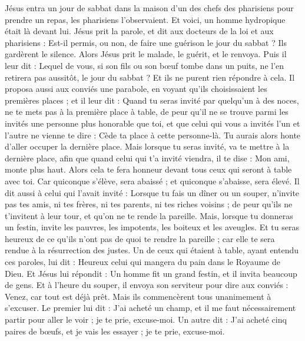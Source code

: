 \begin{multicols}{2}
{\VerseOne{}Jésus entra un jour de sabbat dans la maison d'un des chefs des pharisiens pour prendre un repas, les pharisiens l'observaient.
Et voici, un homme hydropique était là devant lui.
Jésus prit la parole, et dit aux docteurs de la loi et aux pharisiens : Est-il permis, ou non, de faire une guérison le jour du sabbat ?
Ils gardèrent le silence. Alors Jésus prit le malade, le guérit, et le renvoya.
Puis il leur dit : Lequel de vous, si son fils ou son bœuf tombe dans un puits, ne l’en retirera pas aussitôt, le jour du sabbat ?
Et ils ne purent rien répondre à cela.
Il proposa aussi aux conviés une parabole, en voyant qu’ils choisissaient les premières places ; et il leur dit :
Quand tu seras invité par quelqu'un à des noces, ne te mets pas à la première place à table, de peur qu'il ne se trouve parmi les invités une personne plus honorable que toi,
et que celui qui vous a invités l’un et l’autre ne vienne te dire : Cède ta place à cette personne-là. Tu aurais alors honte d’aller occuper la dernière place.
Mais lorsque tu seras invité, va te mettre à la dernière place, afin que quand celui qui t'a invité viendra, il te dise : Mon ami, monte plus haut. Alors cela te fera honneur devant tous ceux qui seront à table avec toi.
Car quiconque s'élève, sera abaissé ; et quiconque s'abaisse, sera élevé.
Il dit aussi à celui qui l'avait invité : Lorsque tu fais un dîner ou un souper, n'invite pas tes amis, ni tes frères, ni tes parents, ni tes riches voisins ; de peur qu'ils ne t’invitent à leur tour, et qu’on ne te rende la pareille.
Mais, lorsque tu donneras un festin, invite les pauvres, les impotents, les boiteux et les aveugles.
Et tu seras heureux de ce qu'ils n'ont pas de quoi te rendre la pareille ; car elle te sera rendue à la résurrection des justes.
\TextTitle{[grandeur]}
Un de ceux qui étaient à table, ayant entendu ces paroles, lui dit : Heureux celui qui mangera du pain dans le Royaume de Dieu.
Et Jésus lui répondit : Un homme fit un grand festin, et il invita beaucoup de gens.
Et à l'heure du souper, il envoya son serviteur pour dire aux conviés : Venez, car tout est déjà prêt.
Mais ils commencèrent tous unanimement à s'excuser. Le premier lui dit : J’ai acheté un champ, et il me faut nécessairement partir pour aller le voir ; je te prie, excuse-moi.
Un autre dit : J’ai acheté cinq paires de bœufs, et je vais les essayer ; je te prie, excuse-moi.
}
\end{multicols}

